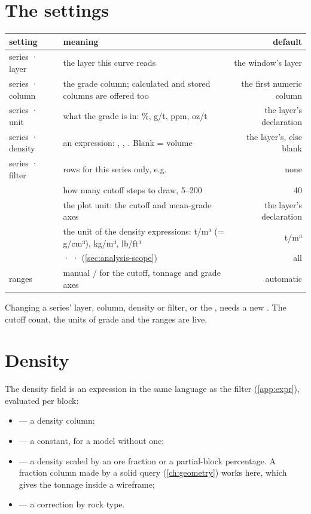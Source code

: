 \section{The settings}\label{sec:gt-settings}
\begin{tabularx}{\linewidth}{@{}lMD@{}}\toprule
setting & meaning & default \\ \midrule
series · layer & the layer this curve reads & the window's layer \\
series · column & the grade column; calculated and stored columns are offered too & the first numeric column \\
series · unit & what the grade is in: \%, g/t, ppm, oz/t & the layer's declaration \\
series · density & an expression: , , . Blank = volume & the layer's, else blank \\
series · filter & rows for this series only, e.g.  & none \\
 & how many cutoff steps to draw, 5–200 & 40 \\
 & the plot unit: the cutoff and mean-grade axes & the layer's declaration \\
 & the unit of the density expressions: t/m³ (= g/cm³), kg/m³, lb/ft³ & t/m³ \\
 &  ·  ·  (\cref{sec:analysis-scope}) & all \\
ranges & manual / for the cutoff, tonnage and grade axes & automatic \\ \bottomrule
\end{tabularx}
\medskip

Changing a series' layer, column, density or filter, or the , needs a new . The cutoff count, the units of grade and the ranges are live.

\section{Density}\label{sec:gt-units}
The density field is an expression in the same language as the filter (\cref{app:expr}), evaluated per block:

\begin{itemize}
\item {} — a density column;
\item {} — a constant, for a model without one;
\item {} — a density scaled by an ore fraction or a partial-block percentage. A fraction column made by a solid query (\cref{ch:geometry}) works here, which gives the tonnage inside a wireframe;
\item {} — a correction by rock type.
\end{itemize}

